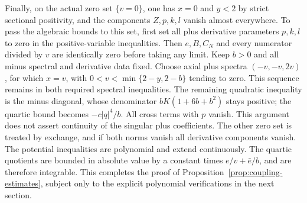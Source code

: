 Finally, on the actual zero set $\{v=0\}$, one has $x=0$ and $y<2$ by
strict sectional positivity, and the components $Z,p,k,l$ vanish almost everywhere.
To pass the algebraic bounds to this set, first set all plus derivative
parameters $p,k,l$ to zero in the positive-variable inequalities.
Then $e,B,C_N$ and every numerator divided by $v$ are identically zero
before taking any limit. Keep $b>0$ and all minus spectral and derivative
data fixed. Choose axial plus spectra $(-v,-v,2v)$, for which $x=v$,
with $0<v<\min\{2-y,2-b\}$ tending to zero. This sequence remains in
both required spectral inequalities. The remaining quadratic inequality
is the minus diagonal, whose denominator $bK(1+6b+b^2)$ stays positive;
the quartic bound becomes $-c|q|^4/b$. All cross terms with $p$ vanish.
This argument does not assert continuity of the singular plus
coefficients. The other zero set is treated by
exchange, and if both norms vanish all derivative components vanish.
The potential inequalities are polynomial and extend continuously.
The quartic quotients are bounded in absolute value by a constant times
$e/v+\bar e/b$, and are therefore integrable. This completes the proof
of Proposition~\ref{prop:coupling-estimates}, subject only to the explicit
polynomial verifications in the next section.
